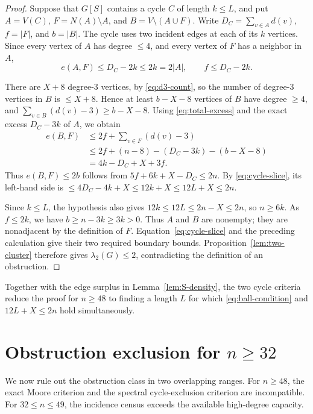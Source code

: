 \documentclass[11pt]{article}
\numberwithin{equation}{section}
\theoremstyle{definition}
\theoremstyle{remark}
\newcommand{\ac}{\lambda_2}
\begin{document}
\begin{proof}
Suppose that \(G[S]\) contains a cycle \(C\) of length \(k\le L\), and
put \(A=V(C)\), \(F=N(A)\setminus A\), and
\(B=V\setminus(A\cup F)\).  Write
\(D_C=\sum_{v\in A}d(v)\), \(f=|F|\), and \(b=|B|\).  The cycle uses two
incident edges at each of its \(k\) vertices.  Since every vertex of \(A\)
has degree \(\le4\), and every vertex of \(F\) has a neighbor in \(A\),
\begin{equation}\label{eq:cycle-slice}
  e(A,F)\le D_C-2k\le2k=2|A|,
  \qquad f\le D_C-2k.
\end{equation}

There are \(X+8\) degree-\(3\) vertices, by \eqref{eq:d3-count}, so the
number of degree-\(3\) vertices in \(B\) is \(\le X+8\).  Hence at least
\(b-X-8\) vertices of \(B\) have degree \(\ge4\), and
\(\sum_{v\in B}(d(v)-3)\ge b-X-8\).  Using
\eqref{eq:total-excess} and the exact excess \(D_C-3k\) of \(A\), we obtain
\[
\begin{aligned}
  e(B,F)
  &\le2f+\sum_{v\in F}(d(v)-3)\\
  &\le2f+(n-8)-(D_C-3k)-(b-X-8)\\
  &=4k-D_C+X+3f.
\end{aligned}
\]
Thus \(e(B,F)\le2b\) follows from \(5f+6k+X-D_C\le2n\).  By
\eqref{eq:cycle-slice}, its left-hand side is
\(\le4D_C-4k+X\le12k+X\le12L+X\le2n\).

Since \(k\le L\), the hypothesis also gives \(12k\le12L\le2n-X\le2n\),
so \(n\ge6k\).  As \(f\le2k\), we have
\(b\ge n-3k\ge3k>0\).  Thus \(A\) and \(B\) are nonempty; they are
nonadjacent by the definition of \(F\).  Equation~\eqref{eq:cycle-slice}
and the preceding calculation give their two required boundary bounds.
Proposition~\ref{lem:two-cluster} therefore gives \(\ac(G)\le2\),
contradicting the definition of an obstruction.
\end{proof}

Together with the edge surplus in Lemma~\ref{lem:S-density}, the two cycle
criteria reduce the proof for \(n\ge48\) to finding a length \(L\) for which
\eqref{eq:ball-condition} and \(12L+X\le2n\) hold simultaneously.

\section{Obstruction exclusion for \texorpdfstring{\(n\ge32\)}{n >= 32}}
\label{sec:obstruction-closure}

We now rule out the obstruction class in two overlapping ranges.  For
\(n\ge48\), the exact Moore criterion and the spectral cycle-exclusion
criterion are incompatible.  For \(32\le n\le49\), the incidence census
exceeds the available high-degree capacity.
\end{document}
